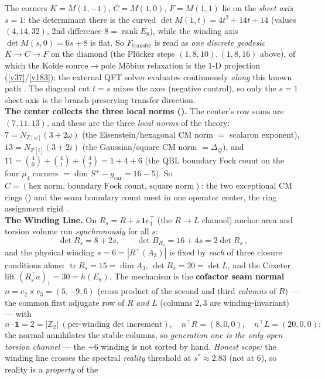 \documentclass[11pt,a4paper]{article}
\newcommand{\gcar}{g_{\mathrm{car}}}
\newcommand{\Z}{\mathbb{Z}}
\theoremstyle{definition}
\begin{document}
\begin{winbox}
The corners $K{=}M(1,{-}1)$, $C{=}M(1,0)$, $F{=}M(1,1)$ lie on the \emph{sheet axis} $s{=}1$: the determinant
there is the curved $\det M(1,t)=4t^2{+}14t{+}14$ (values $(4,14,32)$, 2nd difference $8{=}\operatorname{rank}E_8$),
while the winding axis $\det M(s,0)=6s{+}8$ is flat. So $F_{\mathrm{transfer}}$ is read as \emph{one discrete
geodesic} $K\to C\to F$ on the diamond (the Pl\"ucker steps $(1,8,10),(1,8,16)$ above), of which the Koide
source$\to$pole M\"obius relaxation is the $1$-D projection (\vref{v37}/\vref{v183}); the external QFT solver
evaluates continuously \emph{along} this known path \mC. The diagonal cut $t{=}s$ mixes the axes (negative
control), so only the $s{=}1$ sheet axis is the branch-preserving transfer direction.
\smallskip\\
\noindent\textbf{The center collects the three local norms ().} The
center's row sums are $(7,11,13)$, and these are the three \emph{local norms} of the theory:
$7=N_{\mathbb Z[\omega]}(3{+}2\omega)$ (the Eisenstein/hexagonal CM norm $=$ scalaron exponent),
$13=N_{\mathbb Z[i]}(3{+}2i)$ (the Gaussian/square CM norm $=\Delta_Q$), and
$11=\binom40{+}\binom41{+}\binom42=1{+}4{+}6$ (the QBL boundary Fock count on the four $\mu_4$ corners
$=\dim S^+{-}\gcar=16{-}5$). So $C=(\text{hex norm},\,\text{boundary Fock count},\,\text{square norm})$: the
two exceptional CM rings () and the seam boundary count meet in one operator
center, the ring assignment rigid \mE.
\smallskip\\
\noindent\textbf{The Winding Line.} On $R_s=R+s\,\mathbf 1e_1^\top$ (the $R\to L$ channel) anchor area and
torsion volume run \emph{synchronously} for all $s$:
\[
  \boxed{\ \det R_s=8+2s,\qquad \det B_{R_s}=16+4s=2\det R_s\ },
\]
and the physical winding $s=6=|R^+(A_3)|$ is fixed by \emph{each} of three closure conditions alone:
$\operatorname{tr}R_s=15=\dim A_3$, $\det R_s=20=\det L$, and the Coxeter lift $(R_s^\top a)_1=30=h(E_8)$.
The mechanism is the \textbf{cofactor seam normal} $n=c_2{\times}c_3=(5,-9,6)$ (cross product of the
second and third \emph{columns} of $R$) --- the common first adjugate row of $R$ \emph{and} $L$ (columns
$2,3$ are winding-invariant) --- with
\[
  n\cdot\mathbf 1=2=|\Z_2|\ (\text{per-winding det increment}),\quad
  n^\top R=(8,0,0),\quad n^\top L=(20,0,0):
\]
the normal annihilates the stable columns, so \emph{generation one is the only open torsion channel} ---
the $+6$ winding is not sorted by hand. \emph{Honest scope:} the winding line crosses the spectral
\emph{reality} threshold at $s^*\!\approx\!2.83$ (not at $6$), so reality is a \emph{property} of the

\end{winbox}
\end{document}
